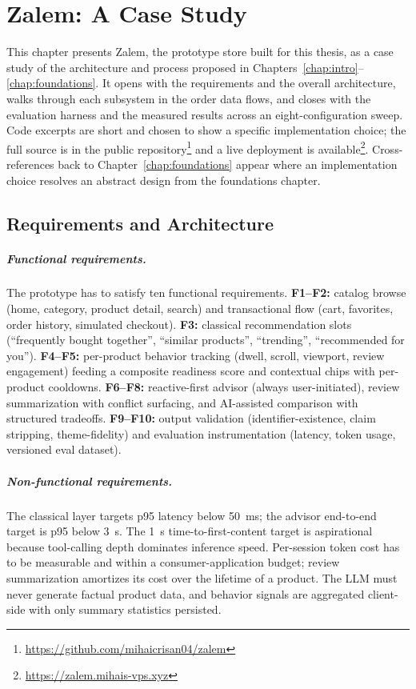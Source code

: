 \chapter{Zalem: A Case Study}
\label{chap:system}

This chapter presents Zalem, the prototype store built for this
thesis, as a case study of the architecture and process proposed
in Chapters~\ref{chap:intro}--\ref{chap:foundations}. It opens with
the requirements and the overall architecture, walks through each
subsystem in the order data flows, and closes with the evaluation
harness and the measured results across an eight-configuration
sweep. Code excerpts are short and chosen to show a specific
implementation choice; the full source is in the public
repository\footnote{\url{https://github.com/mihaicrisan04/zalem}}
and a live deployment is
available\footnote{\url{https://zalem.mihais-vps.xyz}}.
Cross-references back to Chapter~\ref{chap:foundations} appear
where an implementation choice resolves an abstract design from
the foundations chapter.

\section{Requirements and Architecture}
\label{sec:sys-requirements}

\paragraph{Functional requirements.} The prototype has to satisfy
ten functional requirements. \textbf{F1--F2:} catalog browse
(home, category, product detail, search) and transactional flow
(cart, favorites, order history, simulated checkout).
\textbf{F3:} classical recommendation slots (``frequently bought
  together'', ``similar products'', ``trending'', ``recommended
for you''). \textbf{F4--F5:} per-product behavior tracking
(dwell, scroll, viewport, review engagement) feeding a composite
readiness score and contextual chips with per-product cooldowns.
\textbf{F6--F8:} reactive-first advisor (always
user-initiated), review summarization with conflict surfacing,
and AI-assisted comparison with structured tradeoffs.
\textbf{F9--F10:} output validation (identifier-existence, claim
stripping, theme-fidelity) and evaluation instrumentation
(latency, token usage, versioned eval dataset).

\paragraph{Non-functional requirements.} The classical layer
targets p95 latency below 50~ms; the advisor end-to-end target
is p95 below 3~s. The 1~s time-to-first-content target is
aspirational because tool-calling depth dominates inference
speed.
Per-session token cost has to be measurable and within a
consumer-application budget; review summarization amortizes its
cost over the lifetime of a product. The LLM must never generate
factual product data, and behavior signals are aggregated
client-side with only summary statistics persisted.

